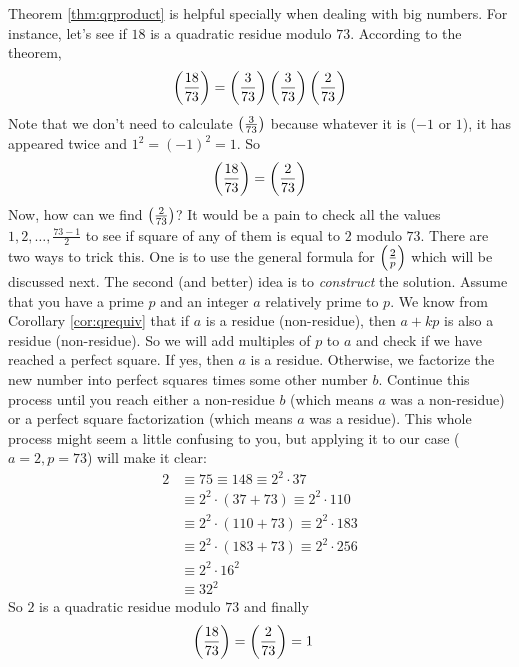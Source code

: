 \begin{example}
	Theorem \eqref{thm:qrproduct} is helpful specially when dealing with big numbers. For instance, let's see if $18$ is a quadratic residue modulo $73$. According to the theorem,
	\begin{align*}
		\left(\dfrac{18}{73}\right) = \left(\dfrac{3}{73}\right) \left(\dfrac{3}{73}\right) \left(\dfrac{2}{73}\right)
	\end{align*}
	Note that we don't need to calculate $ \left(\frac{3}{73}\right)$ because whatever it is ($-1$ or $1$), it has appeared twice and $1^2=(-1)^2=1$. So
	\begin{align*}
		\left(\dfrac{18}{73}\right) = \left(\dfrac{2}{73}\right)
	\end{align*}
	Now, how can we find $ \left(\frac{2}{73}\right)$? It would be a pain to check all the values $1,2,\ldots, \frac{73-1}{2}$ to see if square of any of them is equal to $2$ modulo $73$. There are two ways to trick this. One is to use the general formula for $\left(\frac{2}{p}\right)$ which will be discussed next. The second (and better) idea is to \textit{construct} the solution. Assume that you have a prime $p$ and an integer $a$ relatively prime to $p$. We know from Corollary \ref{cor:qrequiv} that if $a$ is a residue (non-residue), then $a+kp$ is also a residue (non-residue). So we will add multiples of $p$ to $a$ and check if we have reached a perfect square. If yes, then $a$ is a residue. Otherwise, we factorize the new number into perfect squares times some other number $b$. Continue this process until you reach either a non-residue $b$ (which means $a$ was a non-residue) or a perfect square factorization (which means $a$ was a residue). This whole process might seem a little confusing to you, but applying it to our case ($a=2, p=73$) will make it clear:
	\begin{align*}
		2 &\equiv 75 \equiv 148\equiv 2^2 \cdot 37\\
		& \equiv 2^2\cdot (37+73) \equiv 2^2 \cdot 110\\
		&\equiv 2^2\cdot (110+73) \equiv 2^2 \cdot 183\\
		&\equiv 2^2\cdot (183+73) \equiv 2^2 \cdot 256\\
		&\equiv 2^2 \cdot 16^2\\
		&\equiv 32^2
	\end{align*}
	So $2$ is a quadratic residue modulo $73$ and finally
	\begin{align*}
		\left(\dfrac{18}{73}\right) = \left(\dfrac{2}{73}\right)
			& =1
	\end{align*}
\end{example}
